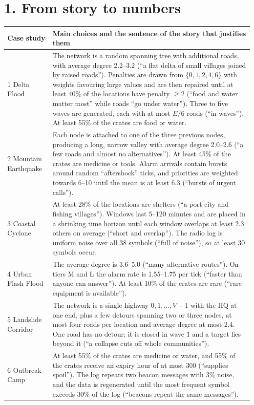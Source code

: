 \section*{1. From story to numbers}
\small
\begin{tabularx}{\textwidth}{@{}l Y@{}}
\toprule
\textbf{Case study} & \textbf{Main choices and the sentence of the story that justifies them}\\
 Delta Flood & The network is a random spanning tree with additional roads, with average degree 2.2--3.2 (``a flat delta of small villages joined by raised roads''). Penalties are drawn from $\{0,1,2,4,6\}$ with weights favouring large values and are then repaired until at least 40\% of the locations have penalty $\ge 2$ (``food and water matter most'' while roads ``go under water''). Three to five waves are generated, each with at most $E/6$ roads (``in waves''). At least 55\% of the crates are food or water.\\
2 Mountain Earthquake & Each node is attached to one of the three previous nodes, producing a long, narrow valley with average degree 2.0--2.6 (``a few roads and almost no alternatives''). At least 45\% of the crates are medicine or tools. Alarm arrivals contain bursts around random ``aftershock'' ticks, and priorities are weighted towards 6--10 until the mean is at least 6.3 (``bursts of urgent calls'').\\
3 Coastal Cyclone & At least 28\% of the locations are shelters (``a port city and fishing villages''). Windows last 5--120 minutes and are placed in a shrinking time horizon until each window overlaps at least 2.3 others on average (``short and overlap''). The radio log is uniform noise over all 38 symbols (``full of noise''), so at least 30 symbols occur.\\
4 Urban Flash Flood & The average degree is 3.6--5.0 (``many alternative routes''). On tiers M and L the alarm rate is 1.55--1.75 per tick (``faster than anyone can answer''). At least 10\% of the crates are rare (``rare equipment is available'').\\
5 Landslide Corridor & The network is a single highway $0,1,\dots,V-1$ with the HQ at one end, plus a few detours spanning two or three nodes, at most four roads per location and average degree at most 2.4. One road has no detour; it is closed in wave 1 and a target lies beyond it (``a collapse cuts off whole communities'').\\
6 Outbreak Camp & At least 55\% of the crates are medicine or water, and 55\% of the crates receive an expiry hour of at most 300 (``supplies spoil''). The log repeats two beacon messages with 3\% noise, and the data is regenerated until the most frequent symbol exceeds 30\% of the log (``beacons repeat the same messages'').\\
\bottomrule
\end{tabularx}
\normalsize
